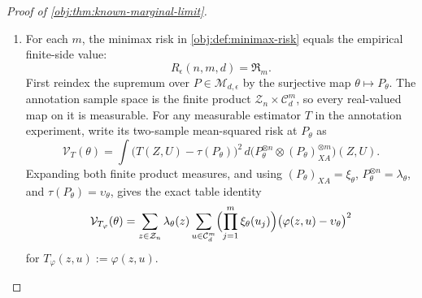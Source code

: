 \documentclass[11pt]{article}
\begin{document}
\begin{proof}[Proof of \cref{obj:thm:known-marginal-limit}]
\begin{enumerate}
\item\label{pf:known-marginal-limit:empirical-risk} For each \(m\), the minimax risk in \cref{obj:def:minimax-risk} equals the empirical finite-side value:
\[
R_\epsilon(n,m,d)=\mathfrak R_m .
\]
First reindex the supremum over \(P\in\mathcal M_{d,\epsilon}\) by the surjective map \(\theta\mapsto P_\theta\).  The annotation sample space is the
finite product \(\mathcal Z_n\times\mathcal C_d^m\), so every real-valued
map on it is measurable.  For any measurable estimator \(T\) in the annotation experiment, write its two-sample mean-squared risk at \(P_\theta\) as
\[
\mathcal V_T(\theta)
=
\int
\bigl(T(Z,U)-\tau(P_\theta)\bigr)^2
\,d\bigl(P_\theta^{\otimes n}\otimes (P_\theta)_{XA}^{\otimes m}\bigr)(Z,U).
\]
Expanding both finite product measures, and using
\((P_\theta)_{XA}=\xi_\theta\),
\(P_\theta^{\otimes n}=\lambda_\theta\), and
\(\tau(P_\theta)=\upsilon_\theta\), gives the exact table identity
\[
\mathcal V_{T_\varphi}(\theta)
=
\sum_{z\in\mathcal Z_n}\lambda_\theta(z)
\sum_{u\in\mathcal C_d^m}
\Bigl(\prod_{j=1}^m\xi_\theta(u_j)\Bigr)
\bigl(\varphi(z,u)-\upsilon_\theta\bigr)^2
\]
for \(T_\varphi(z,u):=\varphi(z,u)\).


\end{enumerate}
\end{proof}
\end{document}

